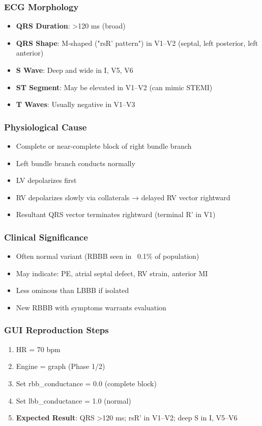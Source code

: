 \documentclass[11pt, a4paper]{article}
\begin{document}
\subsubsection{ECG Morphology}
\begin{itemize}
    \item \textbf{QRS Duration}: >120 ms (broad)
    \item \textbf{QRS Shape}: M-shaped ("rsR' pattern") in V1--V2 (septal, left posterior, left anterior)
    \item \textbf{S Wave}: Deep and wide in I, V5, V6
    \item \textbf{ST Segment}: May be elevated in V1--V2 (can mimic STEMI)
    \item \textbf{T Waves}: Usually negative in V1--V3
\end{itemize}

\subsubsection{Physiological Cause}
\begin{itemize}
    \item Complete or near-complete block of right bundle branch
    \item Left bundle branch conducts normally
    \item LV depolarizes first
    \item RV depolarizes slowly via collaterals → delayed RV vector rightward
    \item Resultant QRS vector terminates rightward (terminal R' in V1)
\end{itemize}

\subsubsection{Clinical Significance}
\begin{itemize}
    \item Often normal variant (RBBB seen in ~0.1\% of population)
    \item May indicate: PE, atrial septal defect, RV strain, anterior MI
    \item Less ominous than LBBB if isolated
    \item New RBBB with symptoms warrants evaluation
\end{itemize}

\subsubsection{GUI Reproduction Steps}
\begin{enumerate}
    \item HR = 70 bpm
    \item Engine = graph (Phase 1/2)
    \item Set rbb\_conductance = 0.0 (complete block)
    \item Set lbb\_conductance = 1.0 (normal)
    \item \textbf{Expected Result}: QRS >120 ms; rsR' in V1--V2; deep S in I, V5--V6
\end{enumerate}
\end{document}
